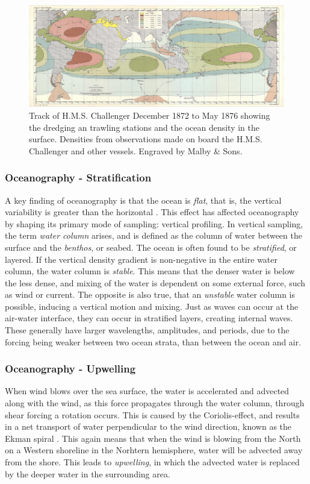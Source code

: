 \begin{figure}
    \centering
    \includegraphics[width=\textwidth]{figures/challenger.png}
    \caption{Track of H.M.S. Challenger December 1872 to May 1876 showing the dredging an trawling stations and the ocean density in the surface. Densities from observations made on board the H.M.S. Challenger and other vessels. Engraved by Malby \& Sons. }
    \label{fig:challenger}
\end{figure}

\subsubsection*{Oceanography - Stratification}
A key finding of oceanography is that the ocean is \textit{flat}, that is, the vertical variability is greater than the horizontal \cite{talley2011descriptive}. This effect has affected oceanography by shaping its primary mode of sampling: vertical profiling. In vertical sampling, the term \textit{water column} arises, and is defined as the column of water between the surface and the \textit{benthos}, or seabed. The ocean is often found to be \textit{stratified}, or layered. If the vertical density gradient is non-negative in the entire water column, the water column is \textit{stable}. This means that the denser water is below the less dense, and mixing of the water is dependent on some external force, such as wind or current. The opposite is also true, that an \textit{unstable} water column is possible, inducing a vertical motion and mixing. Just as waves can occur at the air-water interface, they can occur in stratified layers, creating internal waves. These generally have  larger wavelengths, amplitudes, and periods, due to the forcing being weaker between two ocean strata, than between the ocean and air. 

\subsubsection*{Oceanography - Upwelling}
When wind blows over the sea surface, the water is accelerated and advected along with the wind, as this force propagates through the water column, through shear forcing a rotation occurs. This is caused by the Coriolis-effect, and results in a net transport of water perpendicular to the wind direction, known as the Ekman spiral \cite{ekman1902om}. This again means that when the wind is blowing from the North on a Western shoreline in the Norhtern hemisphere, water will be advected away from the shore. This leads to \textit{upwelling}, in which the advected water is replaced by the deeper water in the surrounding area. 

